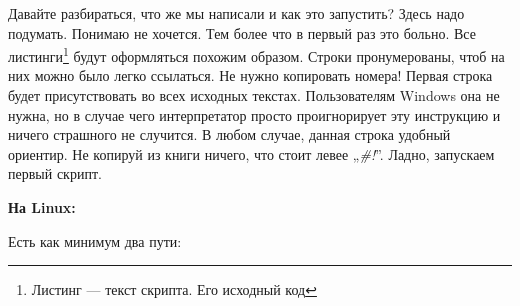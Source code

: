 
Давайте разбираться, что же мы написали и как это запустить? Здесь надо
подумать. Понимаю не хочется. Тем более что в первый раз это больно. Все
листинги\footnote{Листинг --- текст скрипта. Его исходный код}
будут оформляться похожим образом. Строки пронумерованы,
чтоб на них можно было легко ссылаться. Не нужно копировать номера!
Первая строка будет присутствовать во всех исходных текстах. Пользователям
Windows она не нужна, но в случае чего интерпретатор просто проигнорирует
эту инструкцию и ничего страшного не случится. В любом случае, данная строка удобный ориентир.
Не копируй из книги ничего, что стоит левее „\emph{\#!}”. Ладно,
запускаем первый скрипт.

\textbf{На Linux:}

Есть как минимум два пути:

